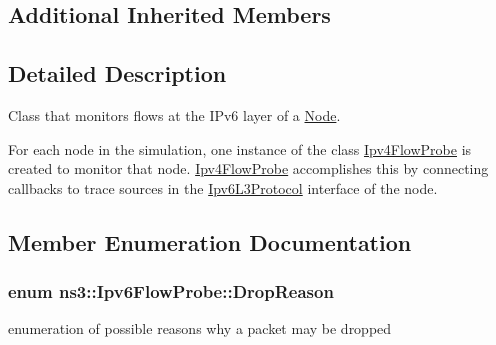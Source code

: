 \subsection*{Additional Inherited Members}


\subsection{Detailed Description}
Class that monitors flows at the I\+Pv6 layer of a \hyperlink{classns3_1_1Node}{Node}. 

For each node in the simulation, one instance of the class \hyperlink{classns3_1_1Ipv4FlowProbe}{Ipv4\+Flow\+Probe} is created to monitor that node. \hyperlink{classns3_1_1Ipv4FlowProbe}{Ipv4\+Flow\+Probe} accomplishes this by connecting callbacks to trace sources in the \hyperlink{classns3_1_1Ipv6L3Protocol}{Ipv6\+L3\+Protocol} interface of the node. 

\subsection{Member Enumeration Documentation}
\subsubsection[{\texorpdfstring{Drop\+Reason}{DropReason}}]{\setlength{\rightskip}{0pt plus 5cm}enum {\bf ns3\+::\+Ipv6\+Flow\+Probe\+::\+Drop\+Reason}}\hypertarget{classns3_1_1Ipv6FlowProbe_ac81e6b10f93e4d47d440d1df59b1e6b1}{}\label{classns3_1_1Ipv6FlowProbe_ac81e6b10f93e4d47d440d1df59b1e6b1}


enumeration of possible reasons why a packet may be dropped 

